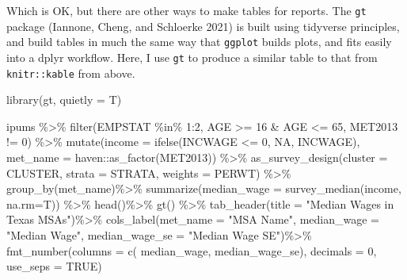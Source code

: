 \documentclass[
  letterpaper,
  DIV=11,
  numbers=noendperiod]{scrreprt}
\newenvironment{Shaded}{\begin{snugshade}}{\end{snugshade}}
\newcommand{\AttributeTok}[1]{\textcolor[rgb]{0.40,0.45,0.13}{#1}}
\newcommand{\ConstantTok}[1]{\textcolor[rgb]{0.56,0.35,0.01}{#1}}
\newcommand{\DecValTok}[1]{\textcolor[rgb]{0.68,0.00,0.00}{#1}}
\newcommand{\FunctionTok}[1]{\textcolor[rgb]{0.28,0.35,0.67}{#1}}
\newcommand{\NormalTok}[1]{\textcolor[rgb]{0.00,0.23,0.31}{#1}}
\newcommand{\SpecialCharTok}[1]{\textcolor[rgb]{0.37,0.37,0.37}{#1}}
\newcommand{\StringTok}[1]{\textcolor[rgb]{0.13,0.47,0.30}{#1}}
\begin{document}
Which is OK, but there are other ways to make tables for reports. The
\texttt{gt} package (Iannone, Cheng, and Schloerke 2021) is built using
tidyverse principles, and build tables in much the same way that
\texttt{ggplot} builds plots, and fits easily into a dplyr workflow.
Here, I use \texttt{gt} to produce a similar table to that from
\texttt{knitr::kable} from above.

\begin{Shaded}
\begin{Highlighting}[]
\FunctionTok{library}\NormalTok{(gt, }\AttributeTok{quietly =}\NormalTok{ T)}

\NormalTok{ipums }\SpecialCharTok{\%\textgreater{}\%}
  \FunctionTok{filter}\NormalTok{(EMPSTAT }\SpecialCharTok{\%in\%} \DecValTok{1}\SpecialCharTok{:}\DecValTok{2}\NormalTok{,}
\NormalTok{         AGE }\SpecialCharTok{\textgreater{}=} \DecValTok{16} \SpecialCharTok{\&}\NormalTok{ AGE }\SpecialCharTok{\textless{}=} \DecValTok{65}\NormalTok{, }
\NormalTok{         MET2013 }\SpecialCharTok{!=} \DecValTok{0}\NormalTok{) }\SpecialCharTok{\%\textgreater{}\%}
  \FunctionTok{mutate}\NormalTok{(}\AttributeTok{income =} \FunctionTok{ifelse}\NormalTok{(INCWAGE }\SpecialCharTok{\textless{}=} \DecValTok{0}\NormalTok{, }\ConstantTok{NA}\NormalTok{, INCWAGE),}
         \AttributeTok{met\_name =}\NormalTok{ haven}\SpecialCharTok{::}\FunctionTok{as\_factor}\NormalTok{(MET2013)) }\SpecialCharTok{\%\textgreater{}\%}
  \FunctionTok{as\_survey\_design}\NormalTok{(}\AttributeTok{cluster =}\NormalTok{ CLUSTER,}
                   \AttributeTok{strata =}\NormalTok{ STRATA,}
                   \AttributeTok{weights =}\NormalTok{ PERWT) }\SpecialCharTok{\%\textgreater{}\%}
  \FunctionTok{group\_by}\NormalTok{(met\_name)}\SpecialCharTok{\%\textgreater{}\%}
  \FunctionTok{summarize}\NormalTok{(}\AttributeTok{median\_wage =} \FunctionTok{survey\_median}\NormalTok{(income, }\AttributeTok{na.rm=}\NormalTok{T)) }\SpecialCharTok{\%\textgreater{}\%}  
  \FunctionTok{head}\NormalTok{()}\SpecialCharTok{\%\textgreater{}\%}
  \FunctionTok{gt}\NormalTok{() }\SpecialCharTok{\%\textgreater{}\%}
    \FunctionTok{tab\_header}\NormalTok{(}\AttributeTok{title =} \StringTok{"Median Wages in Texas MSAs"}\NormalTok{)}\SpecialCharTok{\%\textgreater{}\%}
    \FunctionTok{cols\_label}\NormalTok{(}\AttributeTok{met\_name =} \StringTok{"MSA Name"}\NormalTok{,}
                 \AttributeTok{median\_wage =} \StringTok{"Median Wage"}\NormalTok{,}
                 \AttributeTok{median\_wage\_se =} \StringTok{"Median Wage SE"}\NormalTok{)}\SpecialCharTok{\%\textgreater{}\%}
    \FunctionTok{fmt\_number}\NormalTok{(}\AttributeTok{columns =} \FunctionTok{c}\NormalTok{( median\_wage,  median\_wage\_se), }
                 \AttributeTok{decimals =} \DecValTok{0}\NormalTok{, }\AttributeTok{use\_seps =} \ConstantTok{TRUE}\NormalTok{)}
\end{Highlighting}
\end{Shaded}
\end{document}
